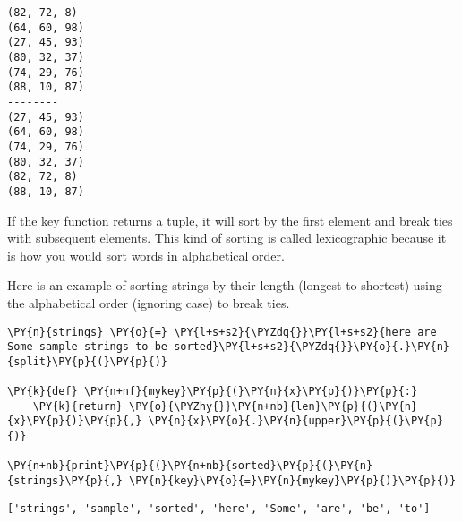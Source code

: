 \begin{Verbatim}
(82, 72, 8)
(64, 60, 98)
(27, 45, 93)
(80, 32, 37)
(74, 29, 76)
(88, 10, 87)
--------
(27, 45, 93)
(64, 60, 98)
(74, 29, 76)
(80, 32, 37)
(82, 72, 8)
(88, 10, 87)

\end{Verbatim}


If the key function returns a tuple, it will sort by the first element and break ties with subsequent elements.  This kind of sorting is called lexicographic because it is how you would sort words in alphabetical order.


Here is an example of sorting strings by their length (longest to shortest) using the alphabetical order (ignoring case) to break ties.


\begin{Verbatim}[commandchars=\\\{\}]
\PY{n}{strings} \PY{o}{=} \PY{l+s+s2}{\PYZdq{}}\PY{l+s+s2}{here are Some sample strings to be sorted}\PY{l+s+s2}{\PYZdq{}}\PY{o}{.}\PY{n}{split}\PY{p}{(}\PY{p}{)}

\PY{k}{def} \PY{n+nf}{mykey}\PY{p}{(}\PY{n}{x}\PY{p}{)}\PY{p}{:}
    \PY{k}{return} \PY{o}{\PYZhy{}}\PY{n+nb}{len}\PY{p}{(}\PY{n}{x}\PY{p}{)}\PY{p}{,} \PY{n}{x}\PY{o}{.}\PY{n}{upper}\PY{p}{(}\PY{p}{)}

\PY{n+nb}{print}\PY{p}{(}\PY{n+nb}{sorted}\PY{p}{(}\PY{n}{strings}\PY{p}{,} \PY{n}{key}\PY{o}{=}\PY{n}{mykey}\PY{p}{)}\PY{p}{)}
\end{Verbatim}

\begin{Verbatim}
['strings', 'sample', 'sorted', 'here', 'Some', 'are', 'be', 'to']

\end{Verbatim}

